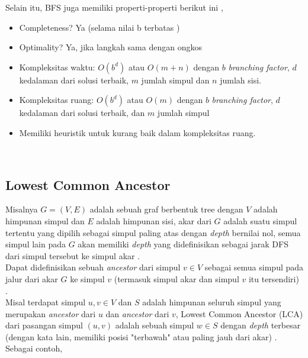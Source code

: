 \documentclass[12pt,a4paper]{article}
\begin{document}
Selain itu, BFS juga memiliki properti-properti berikut ini \cite{stima-graph-2} \cite{cp-bfs},
\begin{itemize}
    \item Completeness? Ya (selama nilai b terbatas )
    \item Optimality? Ya, jika langkah sama dengan ongkos
    \item Kompleksitas waktu: $O(b^d)$ atau $O(m + n)$ dengan $b$ \textit{branching factor}, $d$ kedalaman dari solusi terbaik, $m$ jumlah simpul dan $n$ jumlah sisi.
    \item Kompleksitas ruang: $O(b^d)$ atau $O(m)$ dengan $b$ \textit{branching factor}, $d$ kedalaman dari solusi terbaik, dan $m$ jumlah simpul
    \item Memiliki heuristik untuk kurang baik dalam kompleksitas ruang.
\end{itemize} \\

\subsection{Lowest Common Ancestor} \label{section-lca}

Misalnya $G = (V, E)$ adalah sebuah graf berbentuk tree dengan $V$ adalah himpunan simpul dan $E$ adalah himpunan sisi,
akar dari $G$ adalah suatu simpul tertentu yang dipilih sebagai simpul paling atas dengan \textit{depth} bernilai nol,
semua simpul lain pada $G$ akan memiliki \textit{depth} yang didefinisikan sebagai jarak DFS dari simpul tersebut ke simpul akar \cite{cp-lca}. \\

Dapat didefinisikan sebuah \textit{ancestor} dari simpul $v \in V$ sebagai semua simpul pada jalur dari akar $G$ ke simpul $v$ (termasuk simpul akar dan simpul $v$ itu tersendiri) \cite{cp-lca}. \\

Misal terdapat simpul $u, v \in V$ dan $S$ adalah himpunan seluruh simpul yang merupakan \textit{ancestor} dari $u$ dan \textit{ancestor} dari $v$,
Lowest Common Ancestor (LCA) dari pasangan simpul $(u, v)$ adalah sebuah simpul $w \in S$ dengan \textit{depth} terbesar 
(dengan kata lain, memiliki posisi "terbawah" atau paling jauh dari akar) \cite{cp-lca}. \\

Sebagai contoh, \\
\end{document}
